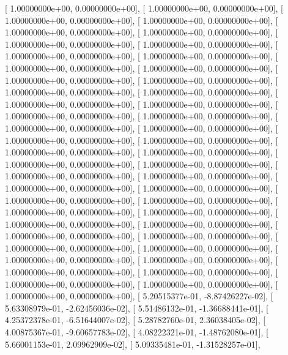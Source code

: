 \documentclass{article}
\begin{document}
       [  1.00000000e+00,   0.00000000e+00],
       [  1.00000000e+00,   0.00000000e+00],
       [  1.00000000e+00,   0.00000000e+00],
       [  1.00000000e+00,   0.00000000e+00],
       [  1.00000000e+00,   0.00000000e+00],
       [  1.00000000e+00,   0.00000000e+00],
       [  1.00000000e+00,   0.00000000e+00],
       [  1.00000000e+00,   0.00000000e+00],
       [  1.00000000e+00,   0.00000000e+00],
       [  1.00000000e+00,   0.00000000e+00],
       [  1.00000000e+00,   0.00000000e+00],
       [  1.00000000e+00,   0.00000000e+00],
       [  1.00000000e+00,   0.00000000e+00],
       [  1.00000000e+00,   0.00000000e+00],
       [  1.00000000e+00,   0.00000000e+00],
       [  1.00000000e+00,   0.00000000e+00],
       [  1.00000000e+00,   0.00000000e+00],
       [  1.00000000e+00,   0.00000000e+00],
       [  1.00000000e+00,   0.00000000e+00],
       [  1.00000000e+00,   0.00000000e+00],
       [  1.00000000e+00,   0.00000000e+00],
       [  1.00000000e+00,   0.00000000e+00],
       [  1.00000000e+00,   0.00000000e+00],
       [  1.00000000e+00,   0.00000000e+00],
       [  1.00000000e+00,   0.00000000e+00],
       [  1.00000000e+00,   0.00000000e+00],
       [  1.00000000e+00,   0.00000000e+00],
       [  1.00000000e+00,   0.00000000e+00],
       [  1.00000000e+00,   0.00000000e+00],
       [  1.00000000e+00,   0.00000000e+00],
       [  1.00000000e+00,   0.00000000e+00],
       [  1.00000000e+00,   0.00000000e+00],
       [  1.00000000e+00,   0.00000000e+00],
       [  1.00000000e+00,   0.00000000e+00],
       [  1.00000000e+00,   0.00000000e+00],
       [  1.00000000e+00,   0.00000000e+00],
       [  1.00000000e+00,   0.00000000e+00],
       [  1.00000000e+00,   0.00000000e+00],
       [  1.00000000e+00,   0.00000000e+00],
       [  1.00000000e+00,   0.00000000e+00],
       [  1.00000000e+00,   0.00000000e+00],
       [  1.00000000e+00,   0.00000000e+00],
       [  1.00000000e+00,   0.00000000e+00],
       [  1.00000000e+00,   0.00000000e+00],
       [  1.00000000e+00,   0.00000000e+00],
       [  1.00000000e+00,   0.00000000e+00],
       [  1.00000000e+00,   0.00000000e+00],
       [  1.00000000e+00,   0.00000000e+00],
       [  1.00000000e+00,   0.00000000e+00],
       [  5.20515377e-01,  -8.87426227e-02],
       [  5.63308979e-01,  -2.62456036e-02],
       [  5.51486132e-01,  -1.36688441e-01],
       [  4.25372378e-01,  -6.51644007e-02],
       [  5.28782760e-01,   2.36038405e-02],
       [  4.00875367e-01,  -9.60657783e-02],
       [  4.08222321e-01,  -1.48762080e-01],
       [  5.66001153e-01,   2.09962909e-02],
       [  5.09335481e-01,  -1.31528257e-01],
\end{document}
